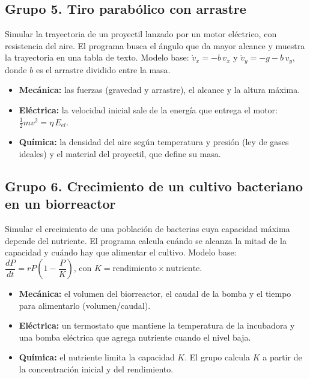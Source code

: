 \documentclass[doc]{apa6}
\begin{document}
\subsection*{Grupo 5. Tiro parabólico con arrastre}
Simular la trayectoria de un proyectil lanzado por un motor eléctrico, con resistencia del aire. El programa busca el ángulo que da mayor alcance y muestra la trayectoria en una tabla de texto. Modelo base: $\dot{v}_x=-b\,v_x$ y $\dot{v}_y=-g-b\,v_y$, donde $b$ es el arrastre dividido entre la masa.
\begin{itemize}
    \item \textbf{Mecánica:} las fuerzas (gravedad y arrastre), el alcance y la altura máxima.
    \item \textbf{Eléctrica:} la velocidad inicial sale de la energía que entrega el motor: $\tfrac{1}{2}mv^2=\eta\,E_{el}$.
    \item \textbf{Química:} la densidad del aire según temperatura y presión (ley de gases ideales) y el material del proyectil, que define su masa.
\end{itemize}

\subsection*{Grupo 6. Crecimiento de un cultivo bacteriano en un biorreactor}
Simular el crecimiento de una población de bacterias cuya capacidad máxima depende del nutriente. El programa calcula cuándo se alcanza la mitad de la capacidad y cuándo hay que alimentar el cultivo. Modelo base: $\dfrac{dP}{dt}=rP\left(1-\dfrac{P}{K}\right)$, con $K=\text{rendimiento}\times\text{nutriente}$.
\begin{itemize}
    \item \textbf{Mecánica:} el volumen del biorreactor, el caudal de la bomba y el tiempo para alimentarlo (volumen/caudal).
    \item \textbf{Eléctrica:} un termostato que mantiene la temperatura de la incubadora y una bomba eléctrica que agrega nutriente cuando el nivel baja.
    \item \textbf{Química:} el nutriente limita la capacidad $K$. El grupo calcula $K$ a partir de la concentración inicial y del rendimiento.
\end{itemize}
\end{document}
